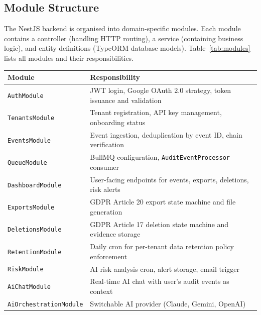 \documentclass[a4paper,12pt,onecolumn]{report}
\begin{document}
\subsection{Module Structure}

The NestJS backend is organised into domain-specific modules.
Each module contains a controller (handling HTTP routing), a service (containing business logic), and entity definitions (TypeORM database models).
Table~\ref{tab:modules} lists all modules and their responsibilities.

\begin{table}[h]
    \begin{center}
        \begin{tabularx}{\textwidth}{|l|X|}
            \hline
            \textbf{Module} & \textbf{Responsibility} \\
            \hline
            \texttt{AuthModule} & JWT login, Google OAuth 2.0 strategy, token issuance and validation \\
            \hline
            \texttt{TenantsModule} & Tenant registration, API key management, onboarding status \\
            \hline
            \texttt{EventsModule} & Event ingestion, deduplication by event ID, chain verification \\
            \hline
            \texttt{QueueModule} & BullMQ configuration, \texttt{AuditEventProcessor} consumer \\
            \hline
            \texttt{DashboardModule} & User-facing endpoints for events, exports, deletions, risk alerts \\
            \hline
            \texttt{ExportsModule} & GDPR Article 20 export state machine and file generation \\
            \hline
            \texttt{DeletionsModule} & GDPR Article 17 deletion state machine and evidence storage \\
            \hline
            \texttt{RetentionModule} & Daily cron for per-tenant data retention policy enforcement \\
            \hline
            \texttt{RiskModule} & AI risk analysis cron, alert storage, email trigger \\
            \hline
            \texttt{AiChatModule} & Real-time AI chat with user's audit events as context \\
            \hline
            \texttt{AiOrchestrationModule} & Switchable AI provider (Claude, Gemini, OpenAI) \\

\end{tabularx}
\end{center}
\end{table}
\end{document}
